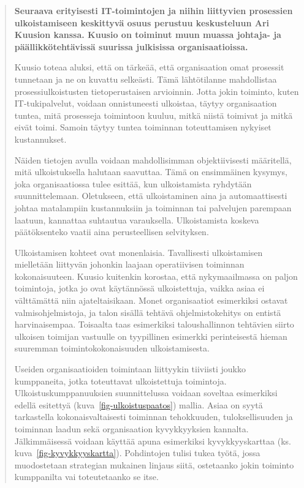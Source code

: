\documentclass[
  finnish,
  letterpaper,
  DIV=11,
  numbers=noendperiod,
  oneside]{scrreprt}
\begin{document}
\begin{quote}
\textbf{Seuraava erityisesti IT-toimintojen ja niihin liittyvien
prosessien ulkoistamiseen keskittyvä osuus perustuu keskusteluun Ari
Kuusion kanssa. Kuusio on toiminut muun muassa johtaja- ja
päällikkötehtävissä suurissa julkisissa organisaatioissa.}

Kuusio toteaa aluksi, että on tärkeää, että organisaation omat prosessit
tunnetaan ja ne on kuvattu selkeästi. Tämä lähtötilanne mahdollistaa
prosessiulkoistusten tietoperustaisen arvioinnin. Jotta jokin toiminto,
kuten IT-tukipalvelut, voidaan onnistuneesti ulkoistaa, täytyy
organisaation tuntea, mitä prosesseja toimintoon kuuluu, mitkä niistä
toimivat ja mitkä eivät toimi. Samoin täytyy tuntea toiminnan
toteuttamisen nykyiset kustannukset.

Näiden tietojen avulla voidaan mahdollisimman objektiivisesti
määritellä, mitä ulkoistuksella halutaan saavuttaa. Tämä on ensimmäinen
kysymys, joka organisaatiossa tulee esittää, kun ulkoistamista ryhdytään
suunnittelemaan. Oletukseen, että ulkoistaminen aina ja automaattisesti
johtaa matalampiin kustannuksiin ja toiminnan tai palvelujen parempaan
laatuun, kannattaa suhtautua varauksella. Ulkoistamista koskeva
päätöksenteko vaatii aina perusteellisen selvityksen.

Ulkoistamisen kohteet ovat monenlaisia. Tavallisesti ulkoistamisen
mielletään liittyvän johonkin laajaan operatiivisen toiminnan
kokonaisuuteen. Kuusio kuitenkin korostaa, että nykymaailmassa on paljon
toimintoja, jotka jo ovat käytännössä ulkoistettuja, vaikka asiaa ei
välttämättä niin ajateltaisikaan. Monet organisaatiot esimerkiksi
ostavat valmisohjelmistoja, ja talon sisällä tehtävä ohjelmistokehitys
on entistä harvinaisempaa. Toisaalta taas esimerkiksi taloushallinnon
tehtävien siirto ulkoisen toimijan vastuulle on tyypillinen esimerkki
perinteisestä hieman suuremman toimintokokonaisuuden ulkoistamisesta.

Useiden organisaatioiden toimintaan liittyykin tiiviisti joukko
kumppaneita, jotka toteuttavat ulkoistettuja toimintoja.
Ulkoistuskumppanuuksien suunnittelussa voidaan soveltaa esimerkiksi
edellä esitettyä (kuva~\ref{fig-ulkoistuspaatos}) mallia. Asiaa on syytä
tarkastella kokonaisvaltaisesti toiminnan tehokkuuden, tuloksellisuuden
ja toiminnan laadun sekä organisaation kyvykkyyksien kannalta.
Jälkimmäisessä voidaan käyttää apuna esimerkiksi kyvykkyyskarttaa (ks.
kuva~\ref{fig-kyvykkyyskartta}). Pohdintojen tulisi tukea työtä, jossa
muodostetaan strategian mukainen linjaus siitä, ostetaanko jokin
toiminto kumppanilta vai toteutetaanko se itse.


\end{quote}
\end{document}

